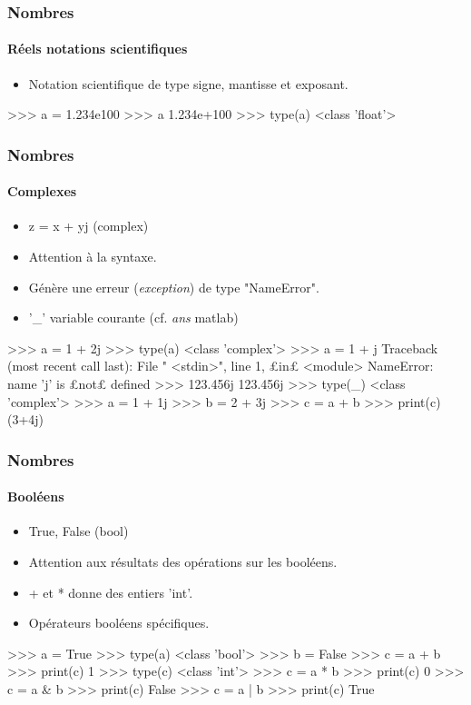 \begin{frame}[fragile]
\frametitle{Nombres}
\framesubtitle{Réels notations scientifiques}
\begin{itemize}
 \item Notation scientifique de type signe, mantisse et exposant. 
\end{itemize}
\begin{pythonConsole}
>>> a = 1.234e100
>>> a
1.234e+100
>>> type(a)
<class 'float'>
\end{pythonConsole}
\end{frame}
\begin{frame}[fragile]
\frametitle{Nombres}
\framesubtitle{Complexes}
\begin{itemize}
 \item z = x + yj (complex)
 \item Attention à la syntaxe. 
 \item Génère une erreur (\emph{exception}) de type "NameError". 
 \item '\_' variable courante (cf. \emph{ans} matlab) 
\end{itemize}
\begin{pythonConsole}
>>> a = 1 + 2j
>>> type(a)
<class 'complex'>
>>> a = 1 + j
Traceback (most recent call last):
  File " <stdin>", line 1, £in£ <module>
NameError: name 'j' is £not£ defined
>>> 123.456j
123.456j
>>> type(_)
<class 'complex'>
>>> a = 1 + 1j
>>> b = 2 + 3j
>>> c = a + b
>>> print(c)
(3+4j)
\end{pythonConsole}
\end{frame}
\begin{frame}[fragile]
\frametitle{Nombres}
\framesubtitle{Booléens}
\begin{itemize}
 \item True, False (bool)
 \item Attention aux résultats des opérations sur les booléens.
 \item + et * donne des entiers 'int'. 
 \item Opérateurs booléens spécifiques.   
\end{itemize}
\begin{pythonConsole}
>>> a = True
>>> type(a)
<class 'bool'>
>>> b = False
>>> c = a + b
>>> print(c)
1
>>> type(c)
<class 'int'>
>>> c = a * b
>>> print(c)
0
>>> c = a & b  
>>> print(c)
False
>>> c = a | b
>>> print(c)
True
\end{pythonConsole}
\end{frame}
